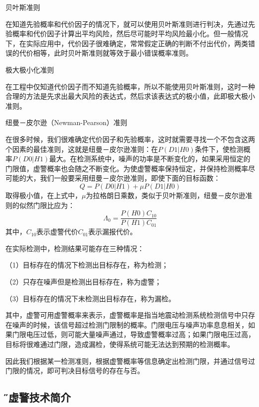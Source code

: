 \documentclass[12pt]{article} %
\begin{document}
	\begin{compactitem} 
 			\item 贝叶斯准则
 			\par 在知道先验概率和代价因子的情况下，就可以使用贝叶斯准则进行判决，先通过先验概率和代价因子计算出平均风险，然后尽可能时平均风险最小化。但一般情况下，在实际应用中，代价因子很难确定，常常假定正确的判断不付出代价，两类错误的代价相等，此时贝叶斯准则就等效于最小错误概率准则。
			\item 极大极小化准则
			\par 在工程中仅知道代价因子而不知道先验概率，所以不能使用贝叶斯准则，这时一种合理的方法是先求出最大风险的表达式，然后求该表达式的极小值，此即极大极小准则。
			\item 纽曼－皮尔逊（Newman-Pearson）准则
			\par 在很多时候，我们很难确定代价因子和先验概率，这时就需要寻找一个不包含这两个因素的最佳准则，这就是纽曼－皮尔逊准则：在$P(D1|H0)$条件下，使检测概率$P(D0|H1)$最大。在检测系统中，噪声的功率是不断变化的，如果采用恒定的门限值，虚警概率也会随之不断变化。为使虚警概率保持恒定，并保持检测概率尽可能的大，我们一般要采用纽曼－皮尔逊准则，即使下面的目标函数：
			\begin{equation}
	Q = P(D0|H1)+\mu P(D1|H0)
	\end{equation}
取得极小值，在上式中，$\mu$为拉格朗日乘数，类似于贝叶斯准则，纽曼－皮尔逊准则的似然门限比应为：
  \begin{equation}
	\Lambda_0 = \frac {P(H0)C_{10}}{P(H1)C_{01}}
	\end{equation}
	其中，$C_{10}$表示虚警代价$C_{01}$表示漏报代价。

		 \end{compactitem}	
	在实际检测中，检测结果可能存在三种情况：
	\par （1）目标存在的情况下检测出目标存在，称为检测；
	\par （2）只存在噪声但是检测出目标存在，称为虚警；
	\par （3）目标存在的情况下未检测出目标存在，称为漏检。
	\par 其中，虚警可用虚警概率来表示，虚警概率是指当地震动检测系统检测信号中只存在噪声的时候，该信号超过检测门限制的概率。门限电压与噪声功率息息相关，如果门限电压过低，则可能大量噪声通过，导致虚警概率过高；如果门限电压过高，目标将很难通过门限，造成漏检，使得系统可能无法达到预期的检测概率。
	\par 因此我们根据某一检测准则，根据虚警概率等信息确定出检测门限，并通过信号过门限的情况，即可判决目标信号的存在与否。
	
 	\subsection{\H 恒虚警技术简介}
\end{document}
